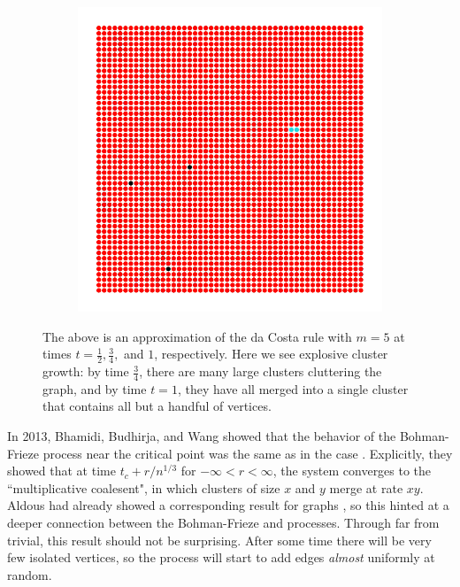 \documentclass[twoside,10pt]{article}
\begin{document}
\begin{figure}[H]
\begin{subfigure}
        \end{subfigure}
        \begin{subfigure}
                \centering
                \includegraphics[scale=0.45]{fig/exp-postcrit.pdf}
        \end{subfigure}
	\caption{The above is an approximation of the da Costa rule with $m = 5$ at times $t = \frac{1}{2} ,\frac{3}{4} ,$ and $1$, respectively. Here we see explosive cluster growth: by time $\frac{3}{4} $, there are many large clusters cluttering the graph, and by time $t=1$, they have all merged into a single cluster that contains all but a handful of vertices.}
\end{figure}

In 2013, Bhamidi, Budhirja, and Wang showed that the behavior of the Bohman-Frieze process near the critical point was the same as in the \ER case \cite{coal}. Explicitly, they showed that at time $t_c + r/n^{1/3}$ for $-\infty<r<\infty$, the system converges to the ``multiplicative coalesent", in which clusters of size $x$ and $y$ merge at rate $xy$. Aldous had already showed a corresponding result for \ER graphs \cite{Aldous}, so this hinted at a deeper connection between the Bohman-Frieze and \ER processes. Through far from trivial, this result should not be surprising. After some time there will be very few isolated vertices, so the process will start to add edges \emph{almost} uniformly at random.
\end{document}

